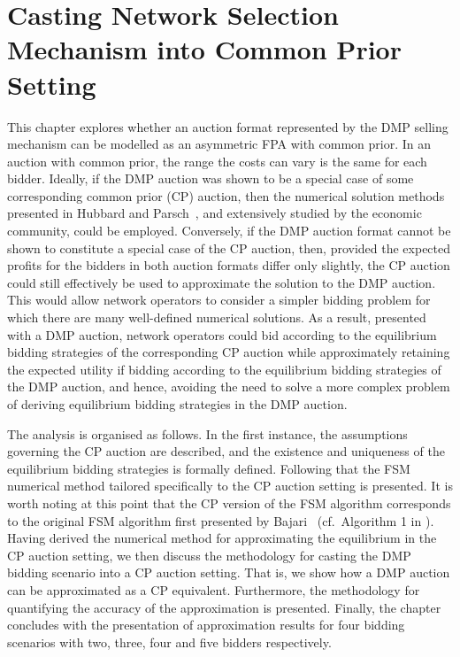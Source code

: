 \chapter{Casting Network Selection Mechanism into Common Prior Setting}
\label{cha:approximation}

\minitoc
\vspace{10mm}

This chapter explores whether an auction format represented by the DMP selling mechanism can be modelled as an asymmetric FPA with common prior. In an auction with common prior, the range the costs can vary is the same for each bidder. Ideally, if the DMP auction was shown to be a special case of some corresponding common prior (CP) auction, then the numerical solution methods presented in Hubbard and Parsch~\cite{HubbardPaarsch2011}, and extensively studied by the economic community, could be employed. Conversely, if the DMP auction format cannot be shown to constitute a special case of the CP auction, then, provided the expected profits for the bidders in both auction formats differ only slightly, the CP auction could still effectively be used to approximate the solution to the DMP auction. This would allow network operators to consider a simpler bidding problem for which there are many well-defined numerical solutions. As a result, presented with a DMP auction, network operators could bid according to the equilibrium bidding strategies of the corresponding CP auction while approximately retaining the expected utility if bidding according to the equilibrium bidding strategies of the DMP auction, and hence, avoiding the need to solve a more complex problem of deriving equilibrium bidding strategies in the DMP auction.

The analysis is organised as follows. In the first instance, the assumptions governing the CP auction are described, and the existence and uniqueness of the equilibrium bidding strategies is formally defined. Following that the FSM numerical method tailored specifically to the CP auction setting is presented. It is worth noting at this point that the CP version of the FSM algorithm corresponds to the original FSM algorithm first presented by Bajari~\cite{Bajari2001a} (cf.~Algorithm 1 in \cite{Bajari2001a}). Having derived the numerical method for approximating the equilibrium in the CP auction setting, we then discuss the methodology for casting the DMP bidding scenario into a CP auction setting. That is, we show how a DMP auction can be approximated as a CP equivalent. Furthermore, the methodology for quantifying the accuracy of the approximation is presented. Finally, the chapter concludes with the presentation of approximation results for four bidding scenarios with two, three, four and five bidders respectively.

